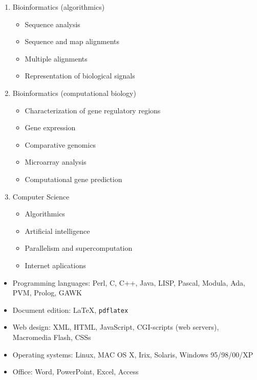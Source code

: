 \vspace{0.5cm}
\begin{enumerate}
\item Bioinformatics (algorithmics)
\begin{itemize}
\item Sequence analysis
\item Sequence and map alignments
\item Multiple alignments
\item Representation of biological signals
\end{itemize}

\item Bioinformatics (computational biology)
\begin{itemize}
\item Characterization of gene regulatory regions
\item Gene expression
\item Comparative genomics
\item Microarray analysis
\item Computational gene prediction
\end{itemize}

\item Computer Science
\begin{itemize}
\item Algorithmics
\item Artificial intelligence
\item Parallelism and supercomputation
\item Internet aplications
\end{itemize}
\end{enumerate}

\vspace{0.5cm}
\begin{itemize}
\item
Programming languages: Perl, C, C++, Java, LISP, Pascal, Modula, Ada, PVM, Prolog, GAWK
\item
Document edition: \LaTeX, \texttt{pdflatex}
\item
Web design: XML, HTML, JavaScript, CGI-scripts (web servers), Macromedia Flash, CSSs
\item
Operating systems:  Linux, MAC OS X, Irix, Solaris, Windows 95/98/00/XP
\item
Office: Word, PowerPoint, Excel, Access
\end{itemize}



